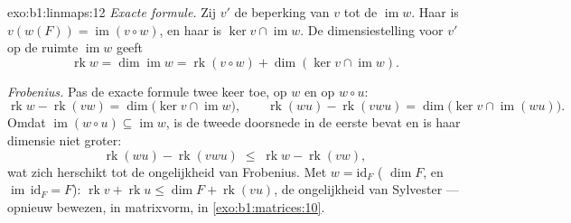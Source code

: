 \begin{solution}{exo:b1:linmaps:12}
\emph{Exacte formule.} Zij $v'$ de beperking van $v$ tot de
 $\operatorname{im} w$. Haar  is $v(w(F)) =
\operatorname{im}(v \circ w)$, en haar  is $\ker v \cap
\operatorname{im} w$. De dimensiestelling voor $v'$ op de ruimte
$\operatorname{im} w$ geeft
\[
\operatorname{rk} w = \dim\operatorname{im} w
= \operatorname{rk}(v \circ w) + \dim(\ker v \cap
\operatorname{im} w) .
\]

\emph{Frobenius.} Pas de exacte formule twee keer toe, op $w$ en op
$w \circ u$:
\[
\operatorname{rk} w - \operatorname{rk}(vw)
= \dim\bigl(\ker v \cap \operatorname{im} w\bigr),
\qquad
\operatorname{rk}(wu) - \operatorname{rk}(vwu)
= \dim\bigl(\ker v \cap \operatorname{im}(wu)\bigr) .
\]
Omdat $\operatorname{im}(w \circ u) \subseteq \operatorname{im} w$,
is de tweede doorsnede in de eerste bevat en is haar dimensie niet
groter:
\[
\operatorname{rk}(wu) - \operatorname{rk}(vwu)
\;\leq\; \operatorname{rk} w - \operatorname{rk}(vw) ,
\]
wat zich herschikt tot de ongelijkheid van Frobenius. Met $w =
\mathrm{id}_F$ ( $\dim F$, en $\operatorname{im}\,
\mathrm{id}_F = F$): $\operatorname{rk} v + \operatorname{rk} u
\leq \dim F + \operatorname{rk}(vu)$, de ongelijkheid van Sylvester
--- opnieuw bewezen, in matrixvorm, in \cref{exo:b1:matrices:10}.
\end{solution}

